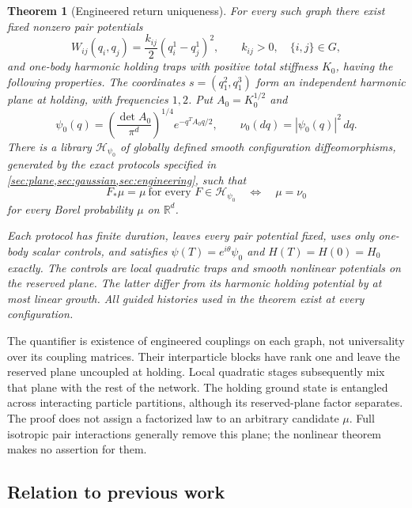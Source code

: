 \documentclass[11pt]{article}
\numberwithin{equation}{section}
\newtheorem{theorem}{Theorem}[section]
\theoremstyle{definition}
\newcommand{\R}{\mathbb R}
\newcommand{\calH}{\mathcal H}
\begin{document}
\begin{theorem}[Engineered return uniqueness]\label{thm:main}
For every such graph there exist fixed nonzero pair potentials
\[
 W_{ij}(q_i,q_j)=\frac{k_{ij}}2(q_i^1-q_j^1)^2,\qquad
 k_{ij}>0,\quad \{i,j\}\in G,
\]
and one-body harmonic holding traps with positive total stiffness $K_0$,
having the following properties. The coordinates
$s=(q_1^2,q_1^3)$ form an independent harmonic plane at holding, with
frequencies $1,2$. Put $A_0=K_0^{1/2}$ and
\begin{equation}\label{eq:reference}
 \psi_0(q)=\left(\frac{\det A_0}{\pi^d}\right)^{1/4}
             e^{-q^TA_0q/2},\qquad \nu_0(dq)=|\psi_0(q)|^2\,dq .
\end{equation}
There is a library $\calH_{\psi_0}$ of globally defined smooth
configuration diffeomorphisms, generated by the exact protocols specified
in \cref{sec:plane,sec:gaussian,sec:engineering}, such that
\begin{equation}\label{eq:main}
 F_*\mu=\mu\ \text{for every }F\in\calH_{\psi_0}
 \quad\Longleftrightarrow\quad \mu=\nu_0
\end{equation}
for every Borel probability $\mu$ on $\R^d$.

Each protocol has finite duration, leaves every pair potential fixed,
uses only one-body scalar controls, and satisfies
$\psi(T)=e^{i\theta}\psi_0$ and $H(T)=H(0)=H_0$ exactly.
The controls are local quadratic traps and smooth nonlinear potentials
on the reserved plane. The latter differ from its harmonic holding
potential by at most linear growth. All guided histories used in the
theorem exist at every configuration.
\end{theorem}

The quantifier is existence of engineered couplings on each graph, not
universality over its coupling matrices. Their interparticle blocks have
rank one and leave the reserved plane uncoupled at holding. Local
quadratic stages subsequently mix that plane with the rest of the
network. The holding ground state is entangled across interacting
particle partitions, although its reserved-plane factor separates.
The proof does not assign a factorized law to an arbitrary candidate
$\mu$. Full isotropic pair interactions generally remove this plane;
the nonlinear theorem makes no assertion for them.

\subsection{Relation to previous work}
\end{document}
